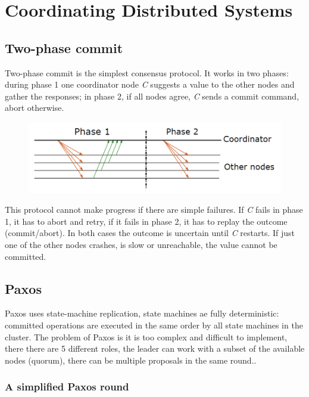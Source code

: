 \chapter{Coordinating Distributed Systems}

\section{Two-phase commit}
	Two-phase commit is the simplest consensus protocol. It works in two phases: during phase 1 one coordinator node \textit{C} suggests a value to the other nodes and gather the responses; in phase 2, if all nodes agree, \textit{C} sends a commit command, abort otherwise.\newline
	\begin{figure}[H]
		\centering
		\includegraphics[width=0.8\linewidth]{images/twophasecommit.png}
	\end{figure}
	This protocol cannot make progress if there are simple failures. If \textit{C} fails in phase 1, it has to abort and retry, if it fails in phase 2, it has to replay the outcome (commit/abort). In both cases the outcome is uncertain until \textit{C} restarts.\newline
	If just one of the other nodes crashes, is slow or unreachable, the value cannot be committed.
	
\section{Paxos}
	Paxos uses state-machine replication, state machines ae fully deterministic: committed operations are executed in the same order by all state machines in the cluster.\newline
	The problem of Paxos is it is too complex and difficult to implement, there there are 5 different roles, the leader can work with a subset of the available nodes (quorum), there can be multiple proposals in the same round..
	\subsection{A simplified Paxos round}
